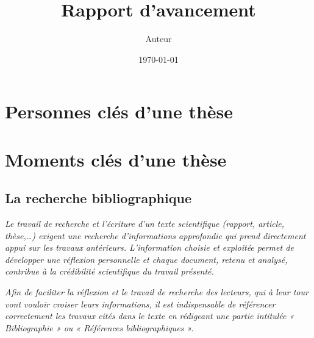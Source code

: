 \documentclass[a4paper,12pt]{report}
\author{Auteur}
\title{Rapport d'avancement}
\date{\today}
\begin{document}
\graphicspath{{Figures/}}




\renewcommand\contentsname{Sommaire}
\setcounter{chapter}{1}
\tableofcontents



\newpage
\section{Personnes clés d'une thèse}



\FloatBarrier
\newpage
\section{Moments clés d'une thèse}
\subsection{La recherche bibliographique}

\textit{Le travail de recherche et l'écriture d'un texte scientifique (rapport, article, thèse,…) exigent une recherche d'informations approfondie qui prend directement appui sur les travaux antérieurs. L'information choisie et exploitée permet de développer une réflexion personnelle et chaque document, retenu et analysé, contribue à la crédibilité scientifique du travail présenté. \\}

\textit{Afin de faciliter la réflexion et le travail de recherche des lecteurs, qui à leur tour vont vouloir croiser leurs informations, il est indispensable de référencer correctement les travaux cités dans le texte en rédigeant une partie intitulée « Bibliographie » ou « Références bibliographiques ». \\}
\end{document}
